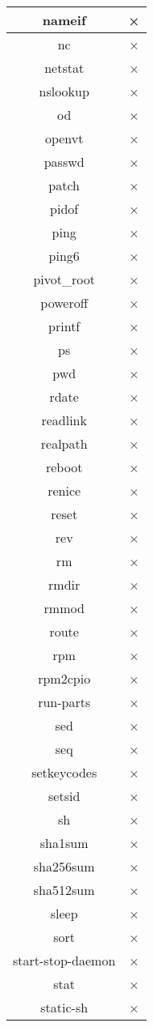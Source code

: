 \begin{longtable}{cc}
nameif & × \\ \hline
nc & × \\ \hline
netstat & × \\ \hline
nslookup & × \\ \hline
od & × \\ \hline
openvt & × \\ \hline
passwd & × \\ \hline
patch & × \\ \hline
pidof & × \\ \hline
ping & × \\ \hline
ping6 & × \\ \hline
pivot_root & × \\ \hline
poweroff & × \\ \hline
printf & × \\ \hline
ps & × \\ \hline
pwd & × \\ \hline
rdate & × \\ \hline
readlink & × \\ \hline
realpath & × \\ \hline
reboot & × \\ \hline
renice & × \\ \hline
reset & × \\ \hline
rev & × \\ \hline
rm & × \\ \hline
rmdir & × \\ \hline
rmmod & × \\ \hline
route & × \\ \hline
rpm & × \\ \hline
rpm2cpio & × \\ \hline
run-parts & × \\ \hline
sed & × \\ \hline
seq & × \\ \hline
setkeycodes & × \\ \hline
setsid & × \\ \hline
sh & × \\ \hline
sha1sum & × \\ \hline
sha256sum & × \\ \hline
sha512sum & × \\ \hline
sleep & × \\ \hline
sort & × \\ \hline
start-stop-daemon & × \\ \hline
stat & × \\ \hline
static-sh & × \\ \hline

\end{longtable}
